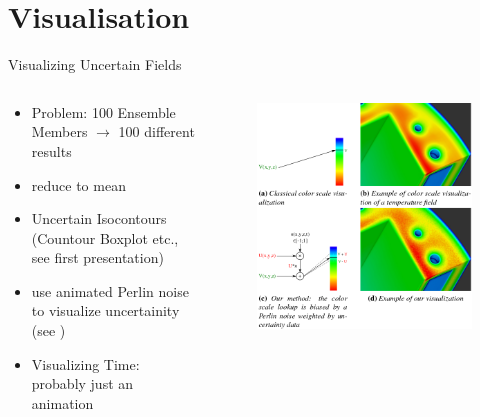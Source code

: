 \section{Visualisation}
\begin{frame}{Visualizing Uncertain Fields}
\begin{columns}
      \begin{column}{.5 \textwidth}
         \begin{itemize}
           \item Problem: 100 Ensemble Members $\to$ 100 different results
           \item reduce to mean 
           \item Uncertain Isocontours (Countour Boxplot etc., see first presentation)
           \item use animated Perlin noise to visualize uncertainity (see \citeauthor{coninx_visualization_2011} \cite{coninx_visualization_2011})
           \item Visualizing Time: probably just an animation
         \end{itemize}
        
      \end{column}
      \begin{column}{.5 \textwidth}
    \begin{figure}[t]
      \centering
      \includegraphics[width=.7 \columnwidth]{imglib/perlin_noise.png}
    \end{figure}
        
      \end{column}
    \end{columns}

\end{frame}
